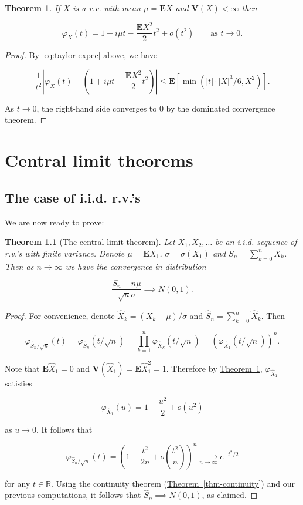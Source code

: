 \documentclass[11pt]{report}
\newcommand{\R}{\mathbb{R}}
\theoremstyle{plain}
\newtheorem{thm}{Theorem}[chapter]
\theoremstyle{definition}
\begin{document}
\begin{thm}
\label{thm-charfun-secondmoment}
If $X$ is a r.v. with mean $\mu=\mathbf{E} X$ and
$\mathbf{V}(X)<\infty$ then

\[
\varphi_X(t) = 1 + i \mu t - \frac{\mathbf{E} X^2}{2} t^2 + o(t^2) \qquad \textrm{as }t\to 0.
\]

\end{thm}

\begin{proof}
By \eqref{eq:taylor-expec} above, we have

\[
\frac{1}{t^2}\left|\varphi_X(t) - \left(1 + i \mu t - \frac{\mathbf{E} X^2}{2} t^2\right)\right| \le \mathbf{E} \left[ \min\left(|t| \cdot |X|^3/6,
X^2 \right) \right].
\]

\noindent As $t\to 0$, the right-hand side converges to 0 by
the dominated convergence theorem.
\end{proof}

\chapter{Central limit theorems}

\section{The case of i.i.d. r.v.’s}

We are now ready to prove:

\begin{thm}[The central limit theorem]
Let $X_1, X_2, \ldots$ be an i.i.d. sequence of
r.v.'s with finite variance. Denote
$\mu = \mathbf{E} X_1$, $\sigma = \sigma(X_1)$ and
$S_n = \sum_{k=0}^n X_k$. Then as $n\to\infty$ we
have the convergence in distribution

\[
\frac{S_n-n\mu}{\sqrt{n}\sigma} \implies N(0,1).
\]

\end{thm}

\begin{proof}
For convenience, denote
$\hat{X}_k = (X_k - \mu)/\sigma$ and
$\hat{S}_n = \sum_{k=0}^n \hat{X}_k$. Then

\[
\varphi_{\hat{S}_n/\sqrt{n}}(t) = \varphi_{\hat{S}_n}(t/\sqrt{n})
= \prod_{k=1}^n \varphi_{\hat{X}_k}(t/\sqrt{n}) = \left(\varphi_{\hat{X}_1}(t/\sqrt{n})\right)^n.
\]

\noindent Note that $\mathbf{E} \hat{X}_1 = 0$ and
$\mathbf{V}(\hat{X}_1)=\mathbf{E} \hat{X}_1^2 = 1$.
Therefore by \hyperref[thm-charfun-secondmoment]{Theorem~\ref*{thm-charfun-secondmoment}},
$\varphi_{\hat{X}_1}$ satisfies

\[
\varphi_{\hat{X}_1}(u) = 1 - \frac{u^2}{2} + o(u^2)
\]

\noindent as $u\to0$. It follows that

\[
\varphi_{\hat{S}_n/\sqrt{n}}(t) = \left(1 - \frac{t^2}{2n} + o\left(\frac{t^2}{n}\right) \right)^n \xrightarrow[n\to\infty]{} e^{-t^2/2}
\]

\noindent for any $t\in\R$. Using the continuity theorem
(\hyperref[thm-continuity]{Theorem~\ref*{thm-continuity}}) and our previous
computations, it follows that
$\hat{S}_n \implies N(0,1)$, as claimed.
\end{proof}
\end{document}
